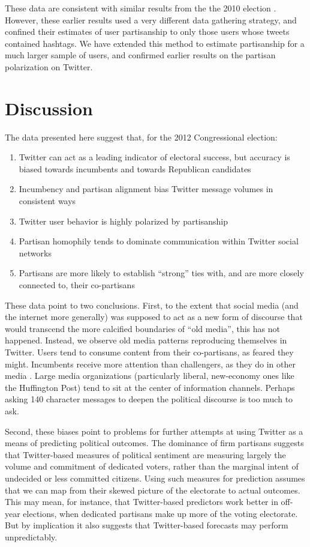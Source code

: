\documentclass[11pt]{article}
\begin{document}
These data are consistent with similar results
from the the 2010 election \cite{conover2011}. However, these
earlier results used a very different data gathering strategy, and
confined their estimates of user partisanship to only those users
whose tweets contained hashtags. We have extended this method to
estimate partisanship for a much larger sample of users, and confirmed
earlier results on the partisan polarization on Twitter. 

\section{Discussion}
\label{sec:discussion}

The data presented here suggest that, for the 2012 Congressional election:

\begin{enumerate}
\item Twitter can act as a leading indicator of electoral success, but
  accuracy is biased towards incumbents and towards Republican candidates
\item Incumbency and partisan alignment bias Twitter message volumes
  in consistent ways
\item Twitter user behavior is highly polarized by partisanship
\item Partisan homophily tends to dominate communication within
  Twitter social networks
\item  Partisans are more likely to establish ``strong'' ties with,
  and are more closely connected to, their
  co-partisans 
\end{enumerate}

These data point to two conclusions. First, to the extent that social
media (and the internet more generally) was supposed to act as a new
form of discourse that would transcend the more calcified boundaries
of ``old media'', this has not happened. Instead, we observe old media
patterns reproducing themselves in Twitter. Users tend to consume
content from their co-partisans, as \cite{sustein2001republic} feared
they might. Incumbents receive more attention than challengers, as
they do in other
media \citep{kahn1993incumbency,schaffner2006local}. Large media
organizations (particularly liberal, new-economy ones like the
Huffington Post) tend to sit at the center of information
channels. Perhaps asking 140 character messages to deepen the
political discourse is too much to ask.

Second, these biases point to problems for further attempts at using
Twitter as a means of predicting political outcomes. The dominance of
firm partisans suggests that Twitter-based measures of political
sentiment are measuring largely the volume and commitment of dedicated
voters, rather than the marginal intent of undecided or less committed
citizens. Using such measures for prediction assumes that we can map
from their skewed picture of the electorate to actual outcomes. This
may mean, for instance, that Twitter-based predictors work better in
off-year elections, when dedicated partisans make up more of the
voting electorate. But by implication it also suggests that
Twitter-based forecasts may perform unpredictably.
\end{document}
